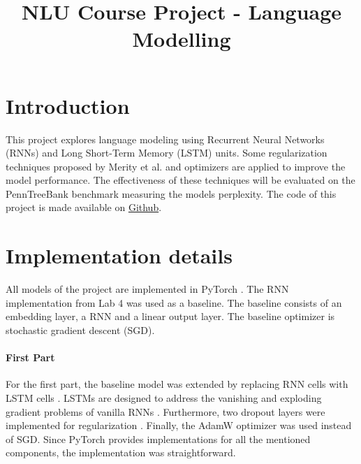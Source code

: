 \documentclass[a4paper]{article}
\title{NLU Course Project - Language Modelling}
\begin{document}
\maketitle


\section{Introduction}
This project explores language modeling using Recurrent Neural Networks (RNNs) and Long Short-Term Memory (LSTM) units. Some regularization techniques proposed by Merity et al. \cite{merity2017regularizing} and optimizers are applied to improve the model performance. The effectiveness of these techniques will be evaluated on the PennTreeBank benchmark measuring the models perplexity. The code of this project is made available on \href{https://github.com/chrisdalvit/nlu-assignment}{Github}.

\section{Implementation details}
\label{sec:implementation}
All models of the project are implemented in PyTorch \cite{paszke2019pytorchimperativestylehighperformance}. The RNN implementation from Lab 4 was used as a baseline. The baseline consists of an embedding layer, a RNN and a linear output layer. The baseline optimizer is stochastic gradient descent (SGD). 
\paragraph*{First Part}
For the first part, the baseline model was extended by replacing RNN cells with LSTM cells \cite{hochreiter1997long}. LSTMs are designed to address the vanishing and exploding gradient problems of vanilla RNNs \cite{sak2014long}. Furthermore, two dropout layers were implemented for regularization \cite{srivastava2014dropout}. Finally, the AdamW \cite{loshchilov2017decoupled} optimizer was used instead of SGD. Since PyTorch provides implementations for all the mentioned components, the implementation was straightforward.
\end{document}
